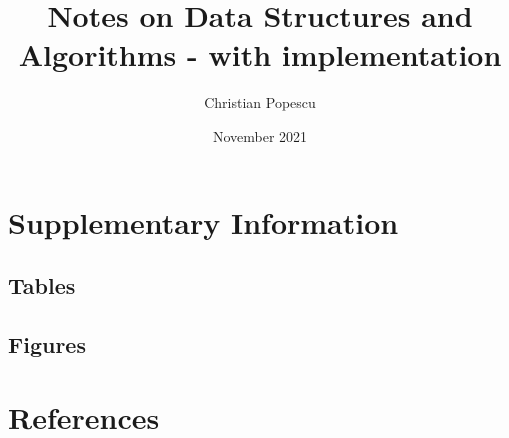 \documentclass[a4paper,12pt]{book}
\begin{document}
\author{Christian Popescu}
\title{Notes on Data Structures and Algorithms - with implementation}
\date{November 2021}

\frontmatter
\maketitle
\tableofcontents
\setcounter{secnumdepth}{5}

\mainmatter














\backmatter
\begin{appendices}
	
	\chapter{Supplementary Information}
	
	\section{Tables}
	
	\section{Figures}
	
	\chapter{References}
	

\end{appendices}

\printbibliography[heading=bibintoc]
\end{document}
